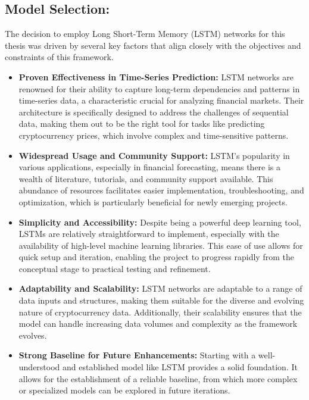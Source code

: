 \subsection{Model Selection:}
The decision to employ Long Short-Term Memory (LSTM) networks for this thesis was driven by several key factors that align closely with the objectives and constraints of this framework. \\

\begin{itemize}
    \item \textbf{Proven Effectiveness in Time-Series Prediction:} LSTM networks are renowned for their ability to capture long-term dependencies and patterns in time-series data, a characteristic crucial for analyzing financial markets. Their architecture is specifically designed to address the challenges of sequential data, making them out to be the right tool for tasks like predicting cryptocurrency prices, which involve complex and time-sensitive patterns.
    \item \textbf{Widespread Usage and Community Support:} LSTM's popularity in various applications, especially in financial forecasting, means there is a wealth of literature, tutorials, and community support available. This abundance of resources facilitates easier implementation, troubleshooting, and optimization, which is particularly beneficial for newly emerging projects.
    \item \textbf{Simplicity and Accessibility:} Despite being a powerful deep learning tool, LSTMs are relatively straightforward to implement, especially with the availability of high-level machine learning libraries. This ease of use allows for quick setup and iteration, enabling the project to progress rapidly from the conceptual stage to practical testing and refinement.
    \item \textbf{Adaptability and Scalability:} LSTM networks are adaptable to a range of data inputs and structures, making them suitable for the diverse and evolving nature of cryptocurrency data. Additionally, their scalability ensures that the model can handle increasing data volumes and complexity as the framework evolves.
    \item \textbf{Strong Baseline for Future Enhancements:} Starting with a well-understood and established model like LSTM provides a solid foundation. It allows for the establishment of a reliable baseline, from which more complex or specialized models can be explored in future iterations.\\
\end{itemize}

